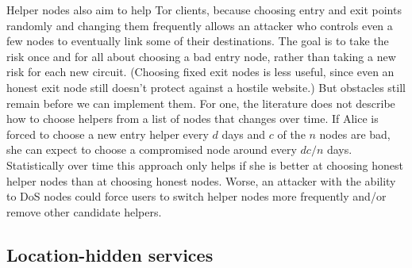 \documentclass{llncs}
\begin{document}
Helper nodes also aim to help Tor clients, because choosing entry and exit points
randomly and changing them frequently allows an attacker who controls
even a few nodes to eventually link some of their destinations. The goal
is to take the risk once and for all about choosing a bad entry node,
rather than taking a new risk for each new circuit. (Choosing fixed
exit nodes is less useful, since even an honest exit node still doesn't
protect against a hostile website.) But obstacles still remain before
we can implement them.
For one, the literature does not describe how to choose helpers from a list
of nodes that changes over time.  If Alice is forced to choose a new entry
helper every $d$ days and $c$ of the $n$ nodes are bad, she can expect
to choose a compromised node around
every $dc/n$ days. Statistically over time this approach only helps
if she is better at choosing honest helper nodes than at choosing
honest nodes.  Worse, an attacker with the ability to DoS nodes could
force users to switch helper nodes more frequently and/or remove
other candidate helpers.


%
%


\subsection{Location-hidden services}
\label{subsec:hidden-services}
\end{document}
